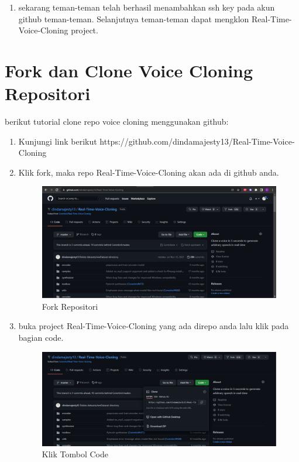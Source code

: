 \begin{enumerate}
\item sekarang teman-teman telah berhasil menambahkan ssh key pada akun github teman-teman. Selanjutnya teman-teman dapat mengklon Real-Time-Voice-Cloning project.

\end{enumerate}

\section{Fork dan Clone Voice Cloning Repositori}
berikut tutorial clone repo voice cloning menggunakan github:
\begin{enumerate}
\item Kunjungi link berikut https://github.com/dindamajesty13/Real-Time-Voice-Cloning
\item Klik fork, maka repo Real-Time-Voice-Cloning akan ada di github anda.
\begin{figure}[H]
\centering
\includegraphics[scale=.3]{figures/repo}
\caption{Fork Repositori}
\label{repo1}
\end{figure}

\item buka project Real-Time-Voice-Cloning yang ada direpo anda lalu klik pada bagian code.
\begin{figure}[H]
\centering
\includegraphics[scale=.3]{figures/repo1}
\caption{Klik Tombol Code}
\label{repo2}
\end{figure}


\end{enumerate}

